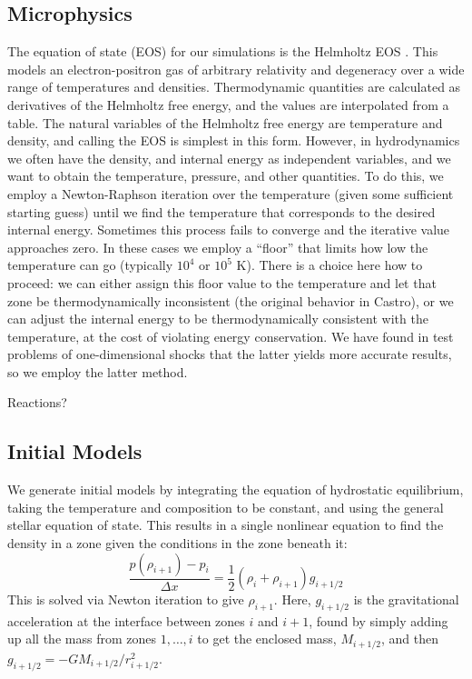 \documentclass[12pt,preprint]{aastex}
\begin{document}
\subsection{Microphysics}

The equation of state (EOS) for our simulations is the Helmholtz EOS \citep{timmes_swesty:2000}. This models an electron-positron gas of arbitrary relativity and degeneracy over a wide range of temperatures and densities. Thermodynamic quantities are calculated as derivatives of the Helmholtz free energy, and the values are interpolated from a table. The natural variables of the Helmholtz free energy are temperature and density, and calling the EOS is simplest in this form. However, in hydrodynamics we often have the density, and internal energy as independent variables, and we want to obtain the temperature, pressure, and other quantities. To do this, we employ a Newton-Raphson iteration over the temperature (given some sufficient starting guess) until we find the temperature that corresponds to the desired internal energy. Sometimes this process fails to converge and the iterative value approaches zero. In these cases we employ a ``floor'' that limits how low the temperature can go (typically $10^4$ or $10^5$ K). There is a choice here how to proceed: we can either assign this floor value to the temperature and let that zone be thermodynamically inconsistent (the original behavior in Castro), or we can adjust the internal energy to be thermodynamically consistent with the temperature, at the cost of violating energy conservation. We have found in test problems of one-dimensional shocks that the latter yields more accurate results, so we employ the latter method.

Reactions?

\subsection{Initial Models}
\label{sec:initial_models}

We generate initial models by integrating the equation of hydrostatic
equilibrium, taking the temperature and composition to be constant,
and using the general stellar equation of state.  This results in
a single nonlinear equation to find the density in a zone given the
conditions in the zone beneath it:
\begin{equation}
\frac{p(\rho_{i+1}) - p_i}{\Delta x} = \frac{1}{2} (\rho_i + \rho_{i+1}) g_{i+1/2}
\end{equation}
This is solved via Newton iteration to give $\rho_{i+1}$.  Here, $g_{i+1/2}$
is the gravitational acceleration at the interface between zones $i$ and $i+1$,
found by simply adding up all the mass from zones $1, \ldots, i$ to get the
enclosed mass, $M_{i+1/2}$, and then $g_{i+1/2} = -GM_{i+1/2}/r_{i+1/2}^2$.
\end{document}
